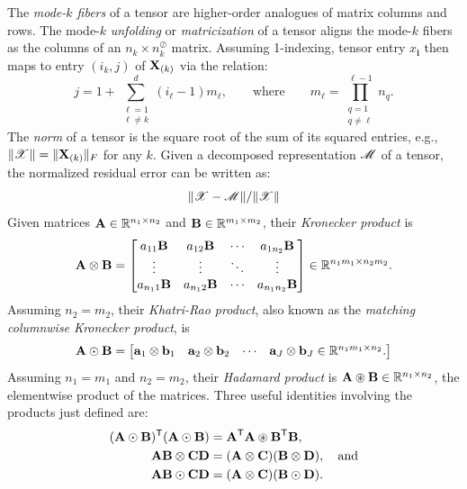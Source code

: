 The \emph{mode-$k$ fibers} of a tensor are higher-order analogues
of matrix columns and rows.
The mode-$k$ \emph{unfolding} or \emph{matricization} of a tensor 
aligns the mode-$k$ fibers as the columns of an $n_k \times n_k^\oslash$ matrix. 
Assuming 1-indexing, tensor entry $x_{\mathbf{i}}$ then maps to
entry $(i_k, j)$ of $\M{X}_{(k)}$ via the relation: 
\begin{equation}
  \label{eqn:unfoldmapping}
  j = 1+\sum_{\substack{\ell=1\\\ell\neq k}}^d (i_\ell -1)m_\ell, \qquad \text{where} \qquad m_\ell = \prod_{\substack{q=1\\q\neq \ell}}^{\ell-1} n_q.
\end{equation}
The \emph{norm} of a tensor is the square root of the sum of its squared entries, 
e.g., $\|\T{X}\| = \|\M{X}_{(k)}\|_F$ for any $k$. Given a decomposed representation $\T{M}$ of a tensor,
the normalized residual error can be written as:
\begin{equation}
\label{eqn:residual}
\|\T{X}-\T{M}\|/{\|\T{X}\|}
\end{equation}
Given matrices $\M{A} \in \mathbb{R}^{n_1 \times n_2}$ and $\M{B} \in \mathbb{R}^{m_1
  \times m_2}$, their \emph{Kronecker product} is 
\begin{displaymath}
  \M{A} \otimes \M{B} =
  \begin{bmatrix}
    a_{11} \M{B} & a_{12} \M{B} & \cdots & a_{1n_2} \M{B} \\
    \vdots & \vdots & \ddots & \vdots \\
    a_{n_1 1} \M{B} & a_{n_1 2} \M{B} & \cdots & a_{n_1 n_2} \M{B} \\
  \end{bmatrix}
  \in \R^{n_1 m_1 \times n_2 m_2}.
\end{displaymath}
%
Assuming $n_2 = m_2$, their \emph{Khatri-Rao product}, also known as the
\emph{matching columnwise Kronecker product}, is
\begin{displaymath}
  \M{A} \odot \M{B} = 
  \begin{bmatrix}
    \V{a}_1 \otimes \V{b}_1 & \V{a}_2 \otimes \V{b}_2
    & \cdots &  \V{a}_J \otimes \V{b}_J \in \mathbb{R}^{n_1 m_1 \times n_2}.   
  \end{bmatrix}
\end{displaymath}
Assuming $n_1=m_1$ and $n_2=m_2$, their \emph{Hadamard product} is
$\M{A}\circledast\M{B} \in \mathbb{R}^{n_1 \times n_2}$, the elementwise product of the matrices.
Three useful identities involving the products just defined are:
\begin{align}
(\M{A} \odot \M{B})^\trans(\M{A} \odot \M{B}) &= \M{A}^\trans\M{A} \circledast \M{B}^\trans\M{B}, \label{eq:KRGram} \\ 
\M{A}\M{B} \otimes \M{C}\M{D} &= (\M{A} \otimes \M{C})(\M{B} \otimes \M{D}) \label{eqn:krondist},\quad\text{and} \\
\M{A}\M{B} \odot \M{C}\M{D} &= (\M{A} \otimes \M{C})(\M{B} \odot \M{D}). \label{eqn:krdist}
\end{align}

